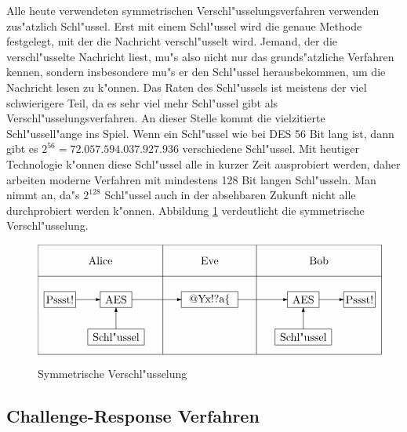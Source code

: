 \documentclass{scrartcl}\usepackage{pslatex}\typearea{12}
\begin{document}
Alle heute verwendeten symmetrischen Verschl"usselungsverfahren
verwenden zus"atzlich Schl"ussel. Erst mit einem Schl"ussel wird die
genaue Methode festgelegt, mit der die Nachricht verschl"usselt wird.
Jemand, der die verschl"usselte Nachricht liest, mu"s also nicht nur
das grunds"atzliche Verfahren kennen, sondern insbesondere mu"s er den
Schl"ussel herausbekommen, um die Nachricht lesen zu k"onnen. Das
Raten des Schl"ussels ist meistens der viel schwierigere Teil, da es
sehr viel mehr Schl"ussel gibt als Verschl"usselungsverfahren. An
dieser Stelle kommt die vielzitierte Schl"ussell"ange ins Spiel. Wenn
ein Schl"ussel wie bei DES 56 Bit lang ist, dann gibt es $2^56 =
72.057.594.037.927.936$ verschiedene Schl"ussel. Mit heutiger
Technologie k"onnen diese Schl"ussel alle in kurzer Zeit ausprobiert
werden, daher arbeiten moderne Verfahren mit mindestens 128 Bit langen
Schl"usseln. Man nimmt an, da"s $2^128$ Schl"ussel auch in der
absehbaren Zukunft nicht alle durchprobiert werden k"onnen. Abbildung
\ref{symmetrisch} verdeutlicht die symmetrische Verschl"usselung.

\begin{figure}\[
\setlength{\unitlength}{1cm}
\begin{picture}(11,3.5)

\put(0,0){\framebox(11,3.5){}}

\put(4,0){\line(0,1){3.5}}
\put(7,0){\line(0,1){3.5}}
\put(0,2.5){\line(1,0){11}}

\put(2,3){\makebox(0,0){Alice}}
\put(5.5,3){\makebox(0,0){Eve}}
\put(9,3){\makebox(0,0){Bob}}

\put(0.2,1.5){\framebox(1,0.5){Pssst!}}
\put(1.2,1.75){\vector(1,0){0.8}}
\put(2,1.5){\framebox(1,0.5){AES}}
\put(3,1.75){\vector(1,0){1.6}}
\put(1.6,0.3){\framebox(1.8,0.5){Schl"ussel}}
\put(2.5,0.8){\vector(0,1){0.7}}

\put(4.6,1.5){\framebox(1.8,0.5){@Yx!?a\{}}
\put(6.4,1.75){\vector(1,0){1.6}}

\put(8,1.5){\framebox(1,0.5){AES}}
\put(7.6,0.3){\framebox(1.8,0.5){Schl"ussel}}
\put(8.5,0.8){\vector(0,1){0.7}}
\put(9,1.75){\vector(1,0){0.8}}
\put(9.8,1.5){\framebox(1,0.5){Pssst!}}

\end{picture}\]
\caption{Symmetrische Verschl"usselung}
\label{symmetrisch}
\end{figure}

\subsection{Challenge-Response Verfahren}
\end{document}
